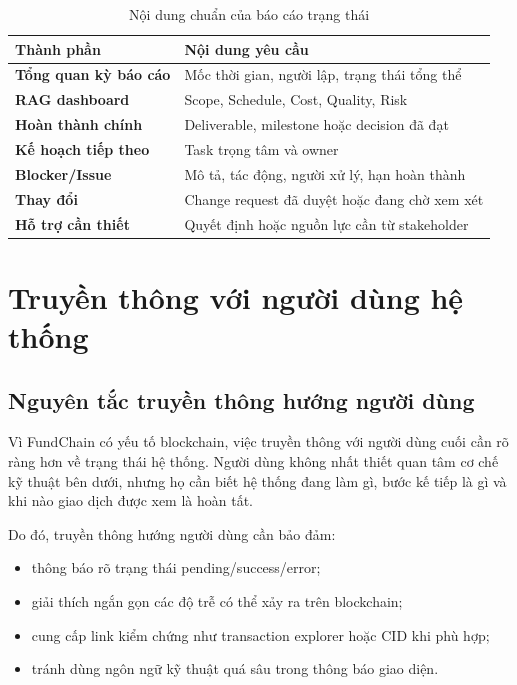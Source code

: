 \begin{table}[H]
\centering
\caption{Nội dung chuẩn của báo cáo trạng thái}
\label{tab:status-report-content}
\begin{tabularx}{\textwidth}{| >{\bfseries}p{3.5cm} | X |}
\hline
Thành phần & Nội dung yêu cầu \\
\hline
Tổng quan kỳ báo cáo & Mốc thời gian, người lập, trạng thái tổng thể \\ \hline
RAG dashboard & Scope, Schedule, Cost, Quality, Risk \\ \hline
Hoàn thành chính & Deliverable, milestone hoặc decision đã đạt \\ \hline
Kế hoạch tiếp theo & Task trọng tâm và owner \\ \hline
Blocker/Issue & Mô tả, tác động, người xử lý, hạn hoàn thành \\ \hline
Thay đổi & Change request đã duyệt hoặc đang chờ xem xét \\ \hline
Hỗ trợ cần thiết & Quyết định hoặc nguồn lực cần từ stakeholder \\
\hline
\end{tabularx}
\end{table}

\iffalse
\section{Truyền thông với người dùng hệ thống}

\subsection{Nguyên tắc truyền thông hướng người dùng}

Vì FundChain có yếu tố blockchain, việc truyền thông với người dùng cuối cần rõ ràng hơn về trạng thái hệ thống. Người dùng không nhất thiết quan tâm cơ chế kỹ thuật bên dưới, nhưng họ cần biết hệ thống đang làm gì, bước kế tiếp là gì và khi nào giao dịch được xem là hoàn tất.

Do đó, truyền thông hướng người dùng cần bảo đảm:

\begin{itemize}
  \item thông báo rõ trạng thái pending/success/error;
  \item giải thích ngắn gọn các độ trễ có thể xảy ra trên blockchain;
  \item cung cấp link kiểm chứng như transaction explorer hoặc CID khi phù hợp;
  \item tránh dùng ngôn ngữ kỹ thuật quá sâu trong thông báo giao diện.
\end{itemize}

